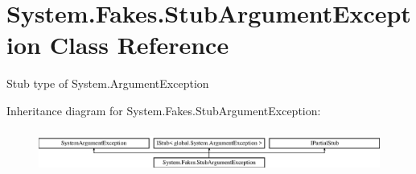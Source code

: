 \hypertarget{class_system_1_1_fakes_1_1_stub_argument_exception}{\section{System.\-Fakes.\-Stub\-Argument\-Exception Class Reference}
\label{class_system_1_1_fakes_1_1_stub_argument_exception}
}


Stub type of System.\-Argument\-Exception 


Inheritance diagram for System.\-Fakes.\-Stub\-Argument\-Exception\-:\begin{figure}[H]
\begin{center}
\leavevmode
\includegraphics[height=1.419518cm]{class_system_1_1_fakes_1_1_stub_argument_exception}
\end{center}
\end{figure}
